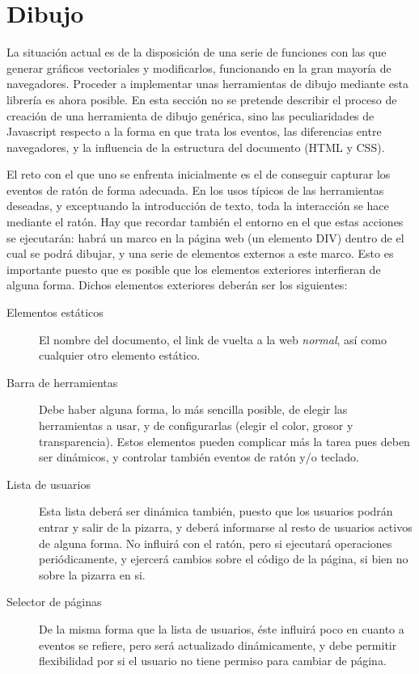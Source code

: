 \section{Dibujo} %
\label{sec:javascript_dibujo}
La situación actual es de la disposición de una serie de funciones con las que generar gráficos vectoriales y modificarlos, funcionando en la gran mayoría de navegadores. Proceder a implementar unas herramientas de dibujo mediante esta librería es ahora posible. En esta sección no se pretende describir el proceso de creación de una herramienta de dibujo genérica, sino las peculiaridades de Javascript respecto a la forma en que trata los eventos, las diferencias entre navegadores, y la influencia de la estructura del documento (HTML y CSS).

El reto con el que uno se enfrenta inicialmente es el de conseguir capturar los eventos de ratón de forma adecuada. En los usos típicos de las herramientas deseadas, y exceptuando la introducción de texto, toda la interacción se hace mediante el ratón. Hay que recordar también el entorno en el que estas acciones se ejecutarán: habrá un marco en la página web (un elemento DIV) dentro de el cual se podrá dibujar, y una serie de elementos externos a este marco. Esto es importante puesto que es posible que los elementos exteriores interfieran de alguna forma. Dichos elementos exteriores deberán ser los siguientes:

\begin{description}
  \item[Elementos estáticos] El nombre del documento, el link de vuelta a la web \emph{normal}, así como cualquier otro elemento estático.
  \item[Barra de herramientas] Debe haber alguna forma, lo más sencilla posible, de elegir las herramientas a usar, y de configurarlas (elegir el color, grosor y transparencia). Estos elementos pueden complicar más la tarea pues deben ser dinámicos, y controlar también eventos de ratón y/o teclado.
  \item[Lista de usuarios] Esta lista deberá ser dinámica también, puesto que los usuarios podrán entrar y salir de la pizarra, y deberá informarse al resto de usuarios activos de alguna forma. No influirá con el ratón, pero si ejecutará operaciones periódicamente, y ejercerá cambios sobre el código de la página, si bien no sobre la pizarra en si.  
  \item[Selector de páginas] De la misma forma que la lista de usuarios, éste influirá poco en cuanto a eventos se refiere, pero será actualizado dinámicamente, y debe permitir flexibilidad por si el usuario no tiene permiso para cambiar de página.
\end{description}

